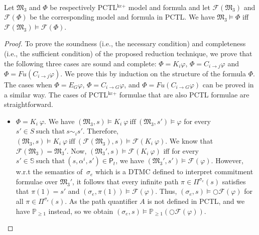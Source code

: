 
\begin{theorem}  \label{soundness-CTLKC+}~\\ Let $\mathfrak{M_3}$ and
$\Phi$ be respectively PCTL$^{\textrm{kc+}}$ model and formula and
let $\mathscr{F}(\mathfrak{M_3})$  and $\mathscr{F}(\Phi)$ be the
corresponding model and formula in PCTL. We have
$\mathfrak{M_3}\models\Phi$ iff $\mathscr{F}(\mathfrak{M_3}) \models
\mathscr{F}(\Phi)$.
\end{theorem}


\begin{proof} %
To prove the soundness (i.e., the necessary condition) and
completeness (i.e., the sufficient condition) of the proposed
reduction technique, we prove that the following three cases are
sound and complete: $\Phi = K_i \varphi$, $\Phi = C_{i \rightarrow
j} \varphi$ and $\Phi = Fu(C_{i \rightarrow j} \varphi)$. We prove
this by induction on the structure of the formula $\Phi$. The
cases when $\Phi = E_G \varphi$, $\Phi = C_{i \to G} \varphi$, and
$\Phi = Fu(C_{i \to G} \varphi)$ can be proved in a similar way.
The cases of PCTL$^{\textrm{kc+}}$ formulae that are also PCTL
formulae are straightforward.

\begin{itemize}
\item $\Phi = K_i ~\varphi$. We have $(\mathfrak{M_3},s)\models K_i
~\varphi ~\text{iff}~ (\mathfrak{M_3},s') \models \varphi$ for every
$s' \in S ~\textrm{such that}~ s\sim_i s'$. Therefore,
$(\mathfrak{M_3},s)\models K_i ~\varphi ~\text{iff}~
(\mathscr{F}(\mathfrak{M_3}),s) \models \mathscr{F}(K_i~\varphi)$.
We know that $\mathscr{F}(\mathfrak{M_3})= \mathfrak{M_3'}$. Now,
$(\mathfrak{M_3'},s) \models \mathscr{F}(K_i~\varphi)$ iff for every
$s' \in \mathbb{S} ~\textrm{such that}~ (s,\alpha^i,s') \in
\textsf{P}_t$, we have $(\mathfrak{M_3'},s') \models
\mathscr{F}(\varphi)$. However, w.r.t the semantics of $~\sigma_e$
which is a DTMC defined to interpret commitment formulae over
$\mathfrak{M_3'}$, it follows that every infinite path $\pi \in
\Pi^{\sigma_e}(s)$ satisfies that $\pi(1)=s'$ and
$(\sigma_e,\pi(1))\models \mathscr{F}(\varphi)$. Thus,
$(\sigma_e,s)\models \bigcirc\mathscr{F}(\varphi)$ for all $\pi
\in \Pi^{\sigma_e}(s)$. As the path quantifier $A$ is not defined
in PCTL, and we have $\mathbb{P}_{\geq1}$ instead, so we obtain
$(\sigma_e,s)\models
\mathbb{P}_{\geq1}(\bigcirc\mathscr{F}(\varphi))$.


\end{itemize}
\end{proof}

